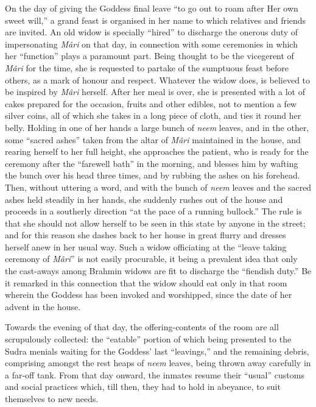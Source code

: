 \documentclass[a4paper, 12pt, oneside, english]{article}
\begin{document}
On the day of giving the Goddess final leave ``to go out to roam after Her own sweet will,'' a grand feast is organised in her name to which relatives and friends are invited. An old widow is specially ``hired'' to discharge the onerous duty of impersonating \emph{Mâri} on that day, in connection with some ceremonies in which her ``function'' plays a paramount part. Being thought to be the vicegerent of \emph{Mâri} for the time, she is requested to partake of the sumptuous feast before others, as a mark of honour and respect. Whatever the widow does, is believed to be inspired by \emph{Mâri} herself. After her meal is over, she is presented with a lot of cakes prepared for the occasion, fruits and other edibles, not to mention a few silver coins, all of which she takes in a long piece of cloth, and ties it round her belly. Holding in one of her hands a large bunch of \emph{neem} leaves, and in the other, some ``sacred ashes'' taken from the altar of \emph{Mâri} maintained in the house, and rearing herself to her full height, she approaches the patient, who is ready for the ceremony after the ``farewell bath'' in the morning, and blesses him by wafting the bunch over his head three times, and by rubbing the ashes on his forehead. Then, without uttering a word, and with the bunch of \emph{neem} leaves and the sacred ashes held steadily in her hands, she suddenly rushes out of the house and proceeds in a southerly direction ``at the pace of a running bullock.'' The rule is that she should not allow herself to be seen in this state by anyone in the street; and for this reason she dashes back to her house in great flurry and dresses herself anew in her usual way. Such a widow officiating at the ``leave taking ceremony of \emph{Mâri}'' is not easily procurable, it being a prevalent idea that only the cast-aways among Brahmin widows are fit to discharge the ``fiendish duty.'' Be it remarked in this connection that the widow should eat only in that room wherein the Goddess has been invoked and worshipped, since the date of her advent in the house.

Towards the evening of that day, the offering-contents of the room are all scrupulously collected: the ``eatable'' portion of which being presented to the Sudra menials waiting for the Goddess' last ``leavings,'' and the remaining debris, comprising amongst the rest heaps of \emph{neem} leaves, being thrown away carefully in a far-off tank. From that day onward, the inmates resume their ``usual'' customs and social practices which, till then, they had to hold in abeyance, to suit themselves to new needs.
\end{document}

